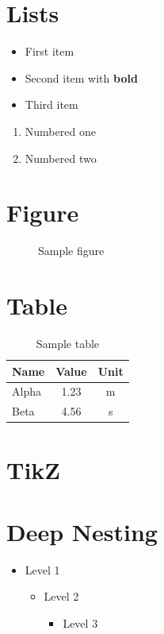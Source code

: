 \documentclass{article}
\begin{document}
\section{Lists}
\begin{itemize}
\item First item
\item Second item with \textbf{bold}
\item Third item
\end{itemize}

\begin{enumerate}
\item Numbered one
\item Numbered two
\end{enumerate}

\section{Figure}
\begin{figure}[h]
\centering
{}
\caption{Sample figure}
\label{fig:sample}
\end{figure}

\section{Table}
\begin{table}[h]
\centering
\begin{tabular}{lcc}
\toprule
Name & Value & Unit \\
\midrule
Alpha & 1.23 & m \\
Beta & 4.56 & s \\
\bottomrule
\end{tabular}
\caption{Sample table}
\label{tab:sample}
\end{table}

\section{TikZ}

\section{Deep Nesting}
\begin{itemize}
\item Level 1
\begin{itemize}
\item Level 2
\begin{itemize}
\item Level 3
\end{itemize}
\end{itemize}
\end{itemize}
\end{document}
